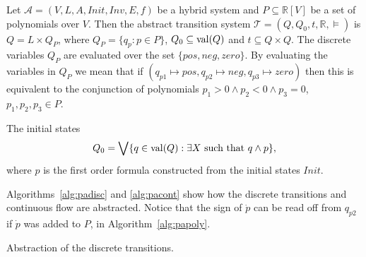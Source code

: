 Let $\mathcal{A}=(V,L,A,Init,Inv,E,f)$ be a hybrid system and $P\subseteq\mathbb{R}[V]$ be a set of polynomials over $V$. Then the abstract transition system
$\mathcal{T}=(Q,Q_{0},t,\mathbb{R},\models)$ is $Q=L\times Q_{P}$, where $Q_{P}=\{q_p : p\in P\}$, $Q_{0}\subseteq\operatorname{val}(Q)$ and $t\subseteq Q\times Q$. The discrete variables $Q_{P}$ are evaluated over the set $\{pos,neg,zero\}$. By evaluating the variables in $Q_{P}$ we mean that if
$(q_{p1}\mapsto pos, q_{p2}\mapsto neg, q_{p3}\mapsto zero)$ then this is equivalent to the conjunction of polynomials $p_{1}>0 \land p_{2}<0\land p_{3}=0$, $p_{1},p_{2},p_{3}\in P$.


The initial states
\begin{equation}
Q_{0}= \bigvee \{q \in \operatorname{val}(Q) : \exists X \text{ such that } q\land p \},
\label{eq:painit}
\end{equation}
where $p$ is the first order formula constructed from the initial states $Init$.

Algorithms~\ref{alg:padisc} and \ref{alg:pacont} show how the discrete transitions and continuous flow are abstracted. Notice that the sign of $\dot{p}$ can be read off from $q_{p2}$ if $\dot{p}$ was added to $P$, in Algorithm~\ref{alg:papoly}.

\begin{algorithm}[H]
\caption{Abstraction of the discrete transitions.}
\label{alg:padisc}
\end{algorithm}

